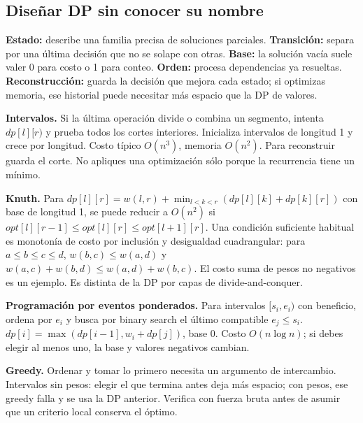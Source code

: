 \subsection{Diseñar DP sin conocer su nombre}
\textbf{Estado:} describe una familia precisa de soluciones parciales. \textbf{Transición:} separa por una última decisión que no se solape con otras. \textbf{Base:} la solución vacía suele valer 0 para costo o 1 para conteo. \textbf{Orden:} procesa dependencias ya resueltas. \textbf{Reconstrucción:} guarda la decisión que mejora cada estado; si optimizas memoria, ese historial puede necesitar más espacio que la DP de valores.

\textbf{Intervalos.} Si la última operación divide o combina un segmento, intenta $dp[l][r)$ y prueba todos los cortes interiores. Inicializa intervalos de longitud 1 y crece por longitud. Costo típico $O(n^3)$, memoria $O(n^2)$. Para reconstruir guarda el corte. No apliques una optimización sólo porque la recurrencia tiene un mínimo.

\textbf{Knuth.} Para $dp[l][r]=w(l,r)+\min_{l<k<r}(dp[l][k]+dp[k][r])$ con base de longitud 1, se puede reducir a $O(n^2)$ si $opt[l][r-1]\le opt[l][r]\le opt[l+1][r]$. Una condición suficiente habitual es monotonía de costo por inclusión y desigualdad cuadrangular: para $a\le b\le c\le d$, $w(b,c)\le w(a,d)$ y $w(a,c)+w(b,d)\le w(a,d)+w(b,c)$. El costo suma de pesos no negativos es un ejemplo. Es distinta de la DP por capas de divide-and-conquer.

\textbf{Programación por eventos ponderados.} Para intervalos $[s_i,e_i)$ con beneficio, ordena por $e_i$ y busca por binary search el último compatible $e_j\le s_i$. $dp[i]=\max(dp[i-1],w_i+dp[j])$, base 0. Costo $O(n\log n)$; si debes elegir al menos uno, la base y valores negativos cambian.

\textbf{Greedy.} Ordenar y tomar lo primero necesita un argumento de intercambio. Intervalos sin pesos: elegir el que termina antes deja más espacio; con pesos, ese greedy falla y se usa la DP anterior. Verifica con fuerza bruta antes de asumir que un criterio local conserva el óptimo.
